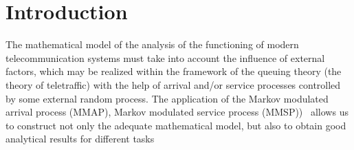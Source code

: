 {%



\maketitle

\section{Introduction}
\label{sec:intro}

The mathematical model of the analysis of the functioning of modern
telecommunication systems must take into account the influence of
external factors, which may be realized within the framework of the
queuing theory (the theory of
teletraffic)\cite{Boch,bash1,MMAP-book,5} with the help of arrival
and/or service processes controlled by some external random
process. The application of the Markov modulated arrival process
(MMAP), Markov modulated service process
(MMSP))~\cite{Neuts3,Neuts4,Neuts5,Neuts6,4,MMAP-book} allows us to
construct not only the adequate mathematical model, but also to obtain
good analytical results for different
tasks~\cite{MMPP-1998,MMPP-2005,vish,koz1,koz2,koz3,raz0,raz1,raz2,raz3,sam1,sam2,6b}

}
